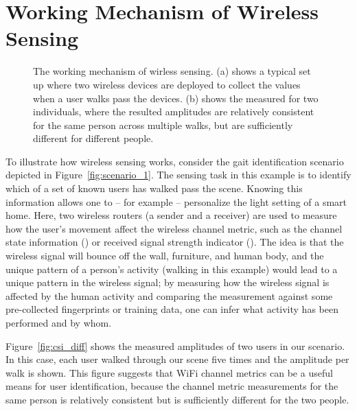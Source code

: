 \section{Working Mechanism of Wireless Sensing\label{sec:mechanism}}
\begin{figure} [t!]
       \centering
     \caption{The working mechanism of wirless sensing. (a) shows a typical set up where two wireless devices are deployed
     to collect the \CSI values when a user walks pass the devices. (b)  shows the measured \CSI  for two
     individuals, where the resulted \CSI amplitudes are relatively consistent for the same person across multiple walks, but are sufficiently different for different people.}
     \label{fig:csi_demo}
\end{figure}


To illustrate how wireless sensing works, consider the gait identification scenario depicted in Figure~\ref{fig:scenario_1}. The sensing
task in this example is to identify which of a set of known users has walked pass the scene. Knowing this information allows one to -- for
example -- personalize the light setting of a smart home. Here, two wireless routers (a sender and a receiver) are used to measure how the
user's movement affect the wireless channel metric, such as the channel state information (\CSI) or received signal strength indicator
(\RSSI). The idea is that the wireless signal will bounce off the wall, furniture, and human body, and the unique pattern of a person’s
activity (walking in this example) would lead to a unique pattern in the wireless signal; by measuring how the wireless signal is affected
by the human activity and comparing the measurement against some pre-collected fingerprints or training data, one can infer what activity
has been performed and by whom.

Figure~\ref{fig:csi_diff} shows the measured \CSI amplitudes of two users in our scenario. In this case, each user walked through our scene
five times and the \CSI amplitude per walk is shown. This figure suggests that WiFi channel metrics can be a useful means for user
identification, because the channel metric measurements for the same person is relatively consistent but is sufficiently different for the
two  people.

